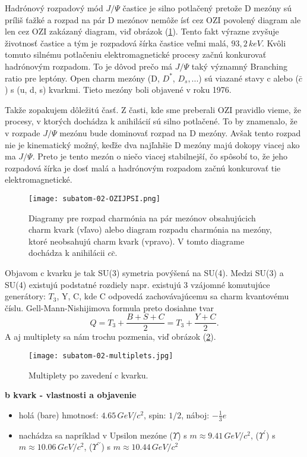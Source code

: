 \documentclass[../../main.tex]{subfiles}
\begin{document}
Hadrónový rozpadový mód $J/\Psi$ častice je silno potlačený pretože D mezóny sú príliš ťažké a rozpad na pár D mezónov nemôže ísť cez OZI povolený diagram ale len cez OZI zakázaný diagram, viď obrázok (\ref{sf2:fig:OZIJPSI}). Tento fakt výrazne zvyšuje životnosť častice a tým je rozpadová šírka častice veľmi malá, $93,2\,\unit{keV}$. Kvôli tomuto silnému potlačeniu elektromagnetické procesy začnú konkurovať hadrónovým rozpadom. To je dôvod prečo má $J/\Psi$ taký významný Branching ratio pre leptóny. Open charm mezóny (D, $D^*$, $D_s,...$) sú viazané stavy c alebo ($\bar{c}$) s (u, d, s) kvarkmi. Tieto mezóny boli objavené v roku 1976.

Takže zopakujem dôležitú časť. Z časti, kde sme preberali OZI pravidlo vieme, že procesy, v ktorých dochádza k anihilácií sú silno potlačené. To by znamenalo, že v rozpade $J/\Psi$ mezónu bude dominovať rozpad na D mezóny. Avšak tento rozpad nie je kinematický možný, keďže dva najľahšie D mezóny majú dokopy viacej ako ma $J/\Psi$. Preto je tento mezón o niečo viacej stabilnejší, čo spôsobí to, že jeho rozpadová šírka je dosť malá a hadrónovým rozpadom začnú konkurovať tie elektromagnetické.

\begin{figure}[!h]
\texttt{[image: subatom-02-OZIJPSI.png]}
\centering
\caption{Diagramy pre rozpad charmónia na pár mezónov obsahujúcich charm kvark (vľavo) alebo diagram rozpadu charmónia na mezóny, ktoré neobsahujú charm kvark (vpravo). V tomto diagrame dochádza k anihilácii $c \bar{c}$.}
\label{sf2:fig:OZIJPSI}
\end{figure}

Objavom c kvarku je tak SU(3) symetria povýšená na SU(4). Medzi SU(3) a SU(4) existujú podstatné rozdiely napr. existujú 3 vzájomné komutujúce generátory: $T_3$, Y, C, kde C odpovedá zachovávajúcemu sa charm kvantovému číslu. Gell-Mann-Nishijimova formula preto dosiahne tvar 
$$ Q = T_3 + \frac{B+S+C}{2} = T_3 + \frac{Y+C}{2}.$$
A aj multiplety sa nám trochu pozmenia, viď obrázok (\ref{sf2:fig:multiplets}).

\begin{figure}[!h]
\texttt{[image: subatom-02-multiplets.jpg]}
\centering
\caption{Multiplety po zavedení c kvarku.}
\label{sf2:fig:multiplets}
\end{figure}


\textbf{b kvark - vlastnosti a objavenie}
\begin{itemize}
\item holá (bare) hmotnosť: $4.65\,\unit{GeV}/c^2$, spin: $1/2$, náboj: $-\frac{1}{3}e$ 
\item nachádza sa napríklad v Upsilon mezóne ($\Upsilon$) s $m \approx 9.41\,\unit{GeV}/c^2$, ($\Upsilon^{\prime}$) s $m \approx 10.06\,\unit{GeV}/c^2$, ($\Upsilon^{\prime \prime}$) s $m \approx 10.44\,\unit{GeV}/c^2$
\end{itemize}
\end{document}
